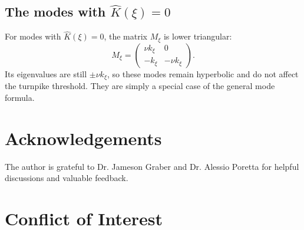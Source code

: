 \documentclass[11pt]{amsart}
\theoremstyle{definition}
\theoremstyle{remark}
\newcommand{\Kh}{\widehat{K}}
\begin{document}
\subsection{The modes with $\Kh(\xi)=0$}
\label{app:zero-modes}

For modes with $\Kh(\xi)=0$, the matrix $M_\xi$ is lower triangular:
\[
M_\xi=
\begin{pmatrix}
\nu k_\xi & 0\\
-k_\xi & -\nu k_\xi
\end{pmatrix}.
\]
Its eigenvalues are still $\pm \nu k_\xi$, so these modes remain hyperbolic and do not affect the turnpike threshold. They are simply a special case of the general mode formula.

\section*{Acknowledgements}

The author is grateful to Dr. Jameson Graber and Dr. Alessio Poretta for helpful discussions and valuable feedback.


\section*{Conflict of Interest}
\end{document}
